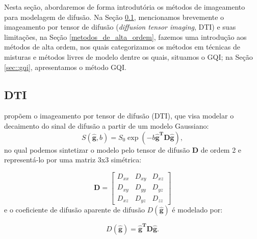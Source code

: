 \documentclass[
    12pt,                %
    oneside,            %
    a4paper,            %
    english,            %
    french,                %
    spanish,            %
    brazil                %
    ]{abntex2}
\begin{document}
Nesta seção, abordaremos de forma introdutória os métodos de imageamento para modelagem de difusão. Na Seção \ref{sec::dti_limitacoes_hardi}, mencionamos brevemente o imageamento por tensor de difusão (\textit{diffusion tensor imaging}, DTI) e suas limitações, na Seção \ref{metodos_de_alta_ordem}, fazemos uma introdução aos métodos de alta ordem, nos quais categorizamos os métodos em técnicas de misturas e métodos livres de modelo dentre os quais, situamos o GQI; na Seção \ref{sec::gqi}, apresentamos o método GQI.




\subsection{DTI}
\label{sec::dti_limitacoes_hardi}

 propõem o imageamento por tensor de difusão (DTI), que visa modelar o decaimento do sinal de difusão a partir de um modelo Gaussiano: 
\begin{equation}
\label{eq::dti_model}
    S(\mathbf{\hat{g}}, b) = S_0\exp{(-b\mathbf{\hat{g}^T}\mathbf{D}\mathbf{\hat{g}})}, 
\end{equation}
no qual podemos sintetizar o modelo pelo tensor de difusão $\mathbf{D}$ de ordem 2 e representá-lo por uma matriz 3x3 simétrica:

\begin{equation}
\label{eq::tensor}
\mathbf{D} = 
\begin{bmatrix}
D_{xx} & D_{xy} & D_{xz} \\ 
D_{xy} & D_{yy} & D_{yz} \\ 
D_{xz} & D_{yz} & D_{zz}  
\end{bmatrix}
\end{equation}
e o coeficiente de difusão aparente de difusão $D(\mathbf{\hat{g}})$ é modelado por:

\begin{equation}
\label{eq::dti_model_adc}
    D(\mathbf{\hat{g}}) = \mathbf{\hat{g}^T}\mathbf{D}\mathbf{\hat{g}}.
\end{equation}
\end{document}

